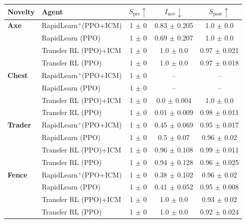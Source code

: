 \begin{table}[t]
\footnotesize
\centering
\begin{tabular}{l l c c c}
\toprule
Novelty & Agent & $S_{\text{pre}} \uparrow$ & $I_{\text{nov}} \downarrow$ & $S_{\text{post}} \uparrow$ \\
\midrule

\textbf{Axe} & RapidLearn$^{+}$(PPO+ICM) & 1 $\pm$ 0 & 0.83 $\pm$ 0.205 & 1.0 $\pm$ 0.0 \\
             & RapidLearn (PPO)          & 1 $\pm$ 0 & 0.69 $\pm$ 0.207 & 1.0 $\pm$ 0.0 \\
             & Transfer RL (PPO)+ICM     & 1 $\pm$ 0 & 1.0 $\pm$ 0.0   & 0.97 $\pm$ 0.021 \\
             & Transfer RL (PPO)         & 1 $\pm$ 0 & 1.0 $\pm$ 0.0   & 0.97 $\pm$ 0.018 \\

\midrule
\textbf{Chest} & RapidLearn$^{+}$(PPO+ICM) & 1 $\pm$ 0 & -- & -- \\
               & RapidLearn (PPO)          & 1 $\pm$ 0 & -- & -- \\
               & Transfer RL (PPO)+ICM     & 1 $\pm$ 0 & 0.0 $\pm$ 0.004 & 1.0 $\pm$ 0.0 \\
               & Transfer RL (PPO)         & 1 $\pm$ 0 & 0.01 $\pm$ 0.009 & 0.98 $\pm$ 0.011 \\

\midrule
\textbf{Trader} & RapidLearn$^{+}$(PPO+ICM) & 1 $\pm$ 0 & 0.45 $\pm$ 0.069 & 0.95 $\pm$ 0.017 \\
                & RapidLearn (PPO)          & 1 $\pm$ 0 & 0.5 $\pm$ 0.07   & 0.96 $\pm$ 0.02 \\
                & Transfer RL (PPO)+ICM     & 1 $\pm$ 0 & 0.96 $\pm$ 0.108 & 0.99 $\pm$ 0.011 \\
                & Transfer RL (PPO)         & 1 $\pm$ 0 & 0.94 $\pm$ 0.128 & 0.96 $\pm$ 0.025 \\

\midrule
\textbf{Fence} & RapidLearn$^{+}$(PPO+ICM) & 1 $\pm$ 0 & 0.38 $\pm$ 0.102 & 0.96 $\pm$ 0.02 \\
               & RapidLearn (PPO)          & 1 $\pm$ 0 & 0.41 $\pm$ 0.052 & 0.95 $\pm$ 0.008 \\
               & Transfer RL (PPO)+ICM     & 1 $\pm$ 0 & 1.0 $\pm$ 0.0   & 0.93 $\pm$ 0.02 \\
               & Transfer RL (PPO)         & 1 $\pm$ 0 & 1.0 $\pm$ 0.0   & 0.92 $\pm$ 0.024 \\


\end{tabular}
\end{table}
